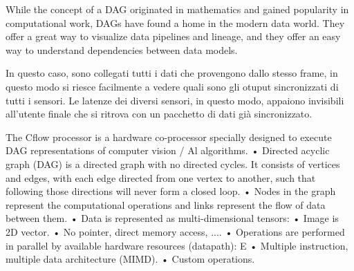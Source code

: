 While the concept of a DAG originated in mathematics and gained popularity in computational work, DAGs have found a home in the modern data world. They offer a great way to visualize data pipelines and lineage, and they offer an easy way to understand dependencies between data models.

In questo caso, sono collegati tutti i dati che provengono dallo stesso frame, in questo modo si riesce facilmente a vedere quali sono gli otuput sincronizzati di tutti i sensori. Le latenze dei diversi sensori, in questo modo, appaiono invisibili all'utente finale che si ritrova con un pacchetto di dati già sincronizzato. 


The Cflow processor is a hardware co-processor specially designed to execute
DAG representations of computer vision / Al algorithms.
• Directed acyclic graph (DAG) is a directed graph with no directed cycles. It consists of vertices and edges, with each edge directed from one vertex to another, such that following those directions will never form a closed loop.
• Nodes in the graph represent the computational operations and links represent the flow of data between them.
• Data is represented as multi-dimensional tensors:
• Image is 2D vector.
• No pointer, direct memory access, ....
• Operations are performed in parallel by available hardware resources (datapath):
E
• Multiple instruction, multiple data architecture (MIMD).
• Custom operations.

